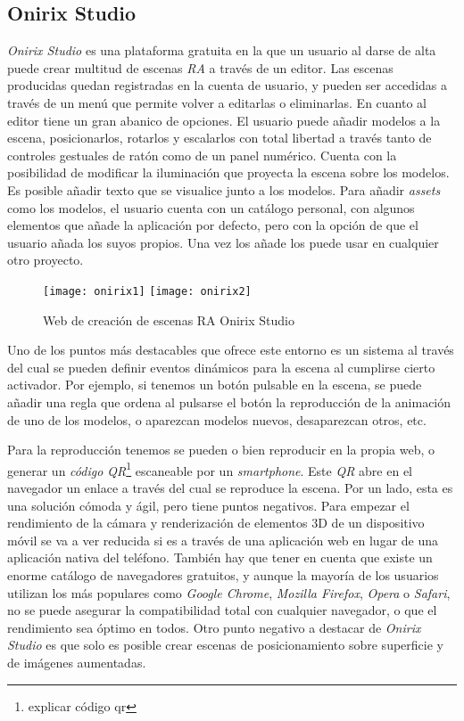 \subsection{Onirix Studio}
\textit{Onirix Studio}\cite{onirix} es una plataforma gratuita en la que un usuario al darse de alta puede crear multitud de escenas \textit{RA} a través de un editor. Las escenas producidas quedan registradas en la cuenta de usuario, y pueden ser accedidas a través de un menú que permite volver a editarlas o eliminarlas. En cuanto al editor tiene un gran abanico de opciones. El usuario puede añadir modelos a la escena, posicionarlos, rotarlos y escalarlos con total libertad a través tanto de controles gestuales de ratón como de un panel numérico. Cuenta con la posibilidad de modificar la iluminación que proyecta la escena sobre los modelos. Es posible añadir texto que se visualice junto a los modelos. Para añadir \textit{assets} como los modelos, el usuario cuenta con un catálogo personal, con algunos elementos que añade la aplicación por defecto, pero con la opción de que el usuario añada los suyos propios. Una vez los añade los puede usar en cualquier otro proyecto.

\begin{figure}[h]
    \centering
    \texttt{[image: onirix1]}
    \texttt{[image: onirix2]}
    \caption[Aplicación Onirix Studio]{Web de creación de escenas RA Onirix Studio}
\end{figure}

Uno de los puntos más destacables que ofrece este entorno es un sistema al través del cual se pueden definir eventos dinámicos para la escena al cumplirse cierto activador. Por ejemplo, si tenemos un botón pulsable en la escena, se puede añadir una regla que ordena al pulsarse el botón la reproducción de la animación de uno de los modelos, o aparezcan modelos nuevos, desaparezcan otros, etc.

Para la reproducción tenemos se pueden o bien reproducir en la propia web, o generar un \textit{código QR}\footnote{explicar código qr} escaneable por un \textit{smartphone}. Este \textit{QR} abre en el navegador un enlace a través del cual se reproduce la escena. Por un lado, esta es una solución cómoda y ágil, pero tiene puntos negativos. Para empezar el rendimiento de la cámara y renderización de elementos 3D de un dispositivo móvil se va a ver reducida si es a través de una aplicación web en lugar de una aplicación nativa del teléfono. También hay que tener en cuenta que existe un enorme catálogo de navegadores gratuitos, y aunque la mayoría de los usuarios utilizan los más populares como \textit{Google Chrome}, \textit{Mozilla Firefox}, \textit{Opera} o \textit{Safari}, no se puede asegurar la compatibilidad total con cualquier navegador, o que el rendimiento sea óptimo en todos. Otro punto negativo a destacar de \textit{Onirix Studio}\cite{onirix} es que solo es posible crear escenas de posicionamiento sobre superficie y de imágenes aumentadas.

